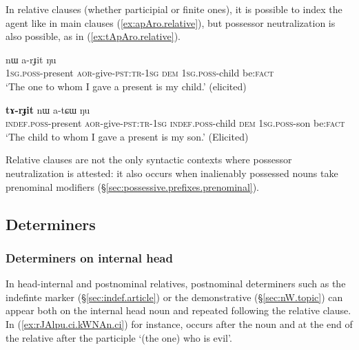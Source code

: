 In relative clauses (whether participial or finite ones), it is possible to index the agent like in main clauses (\ref{ex:apAro.relative}), but  possessor neutralization is also possible, as in (\ref{ex:tApAro.relative}).

\begin{exe}
\ex \label{ex:apAro.relative}
 nɯ a-rɟit ŋu  \\
	\textsc{1sg}.\textsc{poss}-present \textsc{aor}-give-\textsc{pst}:\textsc{tr}-\textsc{1sg} \textsc{dem} \textsc{1sg}.\textsc{poss}-child be:\textsc{fact} \\
\glt `The one to whom I gave a present is my child.' (elicited)
\end{exe} 

\begin{exe}
\ex \label{ex:tApAro.relative}
 \textbf{tɤ-rɟit} nɯ a-tɕɯ ŋu \\
\textsc{indef}.\textsc{poss}-present \textsc{aor}-give-\textsc{pst}:\textsc{tr}-\textsc{1sg} 	\textsc{indef}.\textsc{poss}-child \textsc{dem} \textsc{1sg}.\textsc{poss}-son be:\textsc{fact} \\
\glt `The child to whom I gave a present is my son.' (Elicited)
\end{exe} 

Relative clauses are not the only syntactic contexts where possessor neutralization is attested: it also occurs when inalienably possessed nouns take prenominal modifiers (§\ref{sec:possessive.prefixes.prenominal}).


\subsection{Determiners} \label{sec:relative.determiners}

\subsubsection{Determiners on internal head} \label{sec:head-internal.relative.determiners}
In head-internal and postnominal relatives, postnominal determiners such as the indefinte marker  (§\ref{sec:indef.article}) or the demonstrative  (§\ref{sec:nW.topic}) can appear both on the internal head noun and repeated following the relative clause. In (\ref{ex:rJAlpu.ci.kWNAn.ci}) for instance,  occurs after the noun   and at the end of the relative after the participle  `(the one) who is evil'. 

